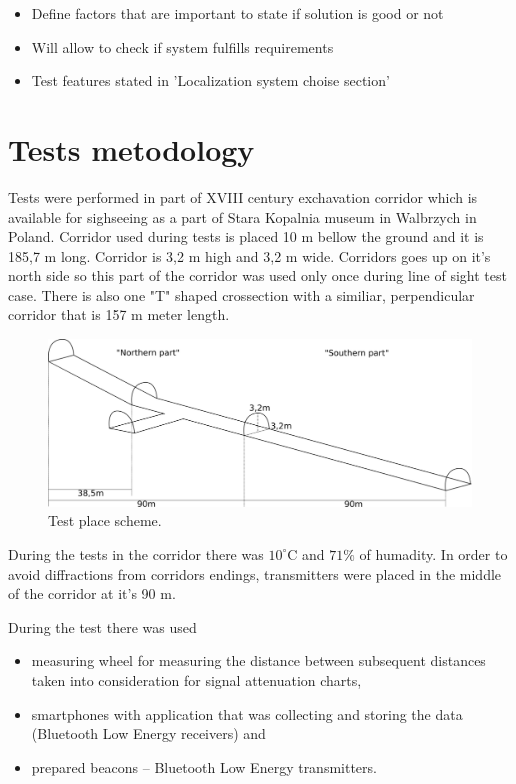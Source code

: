 \documentclass[../main.tex]{subfiles}
\begin{document}
\begin{itemize}
	\item Define factors that are important to state if solution is good or not
	\item Will allow to check if system fulfills requirements
	\item Test features stated in 'Localization system choise section'
\end{itemize}


\section{Tests metodology} %
\label{sec:tests_metodology}

Tests were performed in part of XVIII century exchavation corridor which is available for sighseeing as a part of Stara Kopalnia museum in Walbrzych in Poland. Corridor used during tests is placed 10 m bellow the ground and it is 185,7 m long. Corridor is 3,2 m high and 3,2 m wide. Corridors goes up on it's north side so this part of the corridor was used only once during line of sight test case. There is also one "T" shaped crossection with a similiar, perpendicular corridor that is 157 m meter length.

\begin{figure}[ht]
\includegraphics[width=\textwidth, keepaspectratio]{pictures/corridor.pdf}
\centering
\caption{Test place scheme.}
\label{fig:corridor}
\end{figure}

During the tests in the corridor there was $10^\circ$C  and $71 \%$ of humadity. In order to avoid diffractions from corridors endings, transmitters were placed in the middle of the corridor at it's 90 m.

During the test there was used
\begin{itemize}
	\item  measuring wheel for measuring the distance between subsequent distances taken into consideration for signal attenuation charts,
	\item smartphones with application that was collecting and storing the data (Bluetooth Low Energy receivers) and
	\item prepared beacons -- Bluetooth Low Energy transmitters.
\end{itemize}
\end{document}
